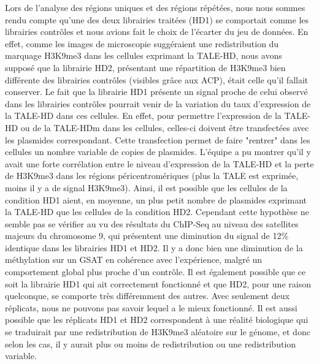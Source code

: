 \documentclass[a4paper,12pt,times]{report}
\begin{document}
Lors de l'analyse des régions uniques et des régions répétées, nous nous sommes rendu compte qu'une des deux librairies traitées (HD1) se comportait comme les librairies contrôles  et nous avions fait le choix de l'écarter du jeu de données. En effet, comme les images de microscopie suggéraient une redistribution du marquage H3K9me3 dans les cellules exprimant la TALE-HD, nous avons supposé que la librairie HD2,  
présentant une répartition de H3K9me3 bien différente des librairies contrôles (visibles grâce aux ACP), était celle qu'il fallait conserver.
\newline
Le fait que  la librairie HD1 présente un signal proche de celui observé dans les librairies contrôles pourrait venir de la variation du taux d'expression de la TALE-HD dans ces cellules.
En effet, pour permettre l'expression de la TALE-HD ou de la TALE-HDm dans les cellules, celles-ci doivent être transfectées avec les plasmides correspondant. Cette transfection permet de faire "rentrer" dans les cellules un nombre variable de copies de plasmides. L'équipe a pu montrer qu'il y avait une forte corrélation entre le niveau d'expression de la TALE-HD et la perte de H3K9me3 dans les régions péricentromériques (plus la TALE est exprimée, moins il y a de signal H3K9me3). Ainsi, il est possible que les cellules de la condition HD1 aient, en moyenne, un plus petit nombre de plasmides exprimant la TALE-HD que les cellules de la condition HD2. 
\newline
Cependant cette hypothèse ne semble pas se vérifier au vu des résultats du ChIP-Seq au niveau des satellites majeurs du chromosome 9, qui présentent une diminution du signal de 12\% identique dans les librairies HD1 et HD2.  Il y a donc bien une diminution de la méthylation sur un GSAT en cohérence avec l'expérience, malgré un comportement global plus proche d'un contrôle.
 \newline Il est également possible que ce soit la librairie HD1 qui ait correctement fonctionné et que HD2, pour une raison quelconque, se comporte très différemment des autres. Avec seulement deux réplicats, nous ne pouvons pas savoir lequel a le mieux fonctionné.
 \newline Il est aussi possible que les réplicats HD1 et HD2 correspondent à une réalité biologique qui se traduirait par une redistribution de H3K9me3 aléatoire sur le génome, et donc selon les cas, il y aurait plus ou moins de redistribution ou une redistribution variable. 
 
\end{document}
